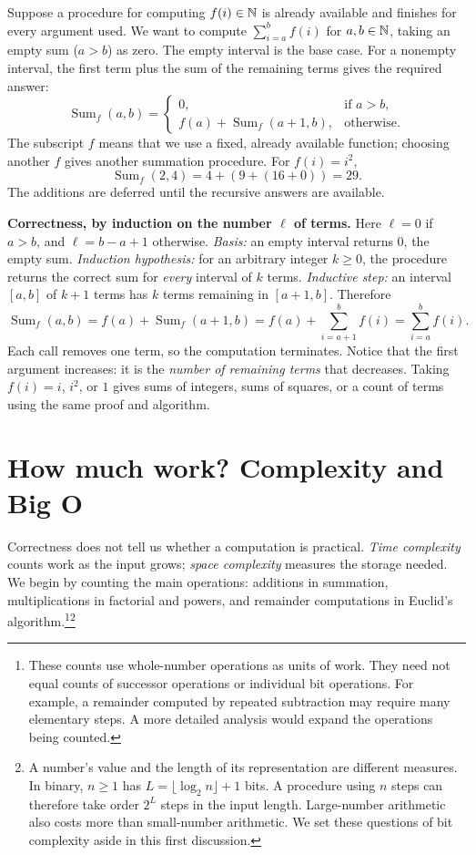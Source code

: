 Suppose a procedure for computing $f(i)\in\mathbb{N}$ is already available and
finishes for every argument used. We want to compute
$\sum_{i=a}^{b}f(i)$ for $a,b\in\mathbb{N}$, taking an empty sum ($a>b$) as zero.
The empty interval is the base case. For a nonempty interval, the first term
plus the sum of the remaining terms gives the required answer:
\[
\operatorname{Sum}_f(a,b)=\begin{cases}
0,&\text{if }a>b,\\
f(a)+\operatorname{Sum}_f(a+1,b),&\text{otherwise}.
\end{cases}
\]
The subscript $f$ means that we use a fixed, already available function;
choosing another $f$ gives another summation procedure. For $f(i)=i^2$,
\[
\operatorname{Sum}_f(2,4)=4+(9+(16+0))=29.
\]
The additions are deferred until the recursive answers are available.

\textbf{Correctness, by induction on the number $\ell$ of terms.}
Here $\ell=0$ if $a>b$, and $\ell=b-a+1$ otherwise.
\emph{Basis:} an empty interval returns $0$, the empty sum.
\emph{Induction hypothesis:} for an arbitrary integer $k\geq0$, the
procedure returns the correct sum for \emph{every} interval of $k$ terms.
\emph{Inductive step:} an interval $[a,b]$ of $k+1$ terms has $k$ terms
remaining in $[a+1,b]$. Therefore
\[
\operatorname{Sum}_f(a,b)
=f(a)+\operatorname{Sum}_f(a+1,b)
=f(a)+\sum_{i=a+1}^{b}f(i)=\sum_{i=a}^{b}f(i).
\]
Each call removes one term, so the computation terminates. Notice that the
first argument increases: it is the \emph{number of remaining terms} that
decreases. Taking $f(i)=i$, $i^2$, or $1$ gives sums of integers, sums of
squares, or a count of terms using the same proof and algorithm.

\section{How much work? Complexity and Big O}

Correctness does not tell us whether a computation is practical.
\emph{Time complexity} counts work as the input grows; \emph{space
complexity} measures the storage needed. We begin by counting the main
operations: additions in summation, multiplications in factorial and powers,
and remainder computations in Euclid's algorithm.\footnote{These counts use
whole-number operations as units of work. They need not equal counts of
successor operations or individual bit operations. For example, a remainder
computed by repeated subtraction may require many elementary steps. A more
detailed analysis would expand the operations being counted.}\footnote{A
number's value and the length of its representation are different measures.
In binary, $n\geq1$ has $L=\lfloor\log_2 n\rfloor+1$ bits. A procedure
using $n$ steps can therefore take order $2^L$ steps in the input length.
Large-number arithmetic also costs more than small-number arithmetic.
We set these questions of bit complexity aside in this first discussion.}

